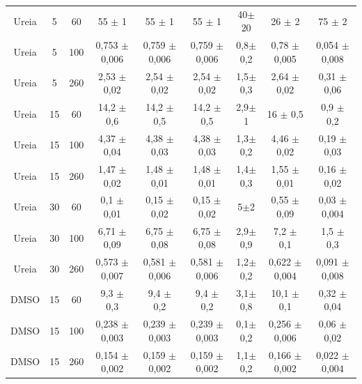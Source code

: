 \begin{table}[h]
\begin{adjustbox}{angle=90}
{\begin{tabular}{c c c | c c c c c c}
			Ureia   & 5          & 60       & 55      \(\pm\) 1      & 55       \(\pm\) 1      & 55        \(\pm\) 1       & 40\(\pm\)20   & 26          \(\pm\) 2      & 75          \(\pm\) 2      \\
			Ureia   & 5          & 100      & 0,753   \(\pm\) 0,006  & 0,759    \(\pm\) 0,006  & 0,759     \(\pm\) 0,006   & 0,8\(\pm\)0,2 & 0,78        \(\pm\) 0,005  & 0,054       \(\pm\) 0,008  \\
			Ureia   & 5          & 260      & 2,53    \(\pm\) 0,02   & 2,54     \(\pm\) 0,02   & 2,54      \(\pm\) 0,02    & 1,5\(\pm\)0,3 & 2,64        \(\pm\) 0,02   & 0,31        \(\pm\) 0,06   \\
			Ureia   & 15         & 60       & 14,2    \(\pm\) 0,6    & 14,2     \(\pm\) 0,5    & 14,2      \(\pm\) 0,5     & 2,9\(\pm\)1   & 16          \(\pm\) 0,5    & 0,9         \(\pm\) 0,2    \\
			Ureia   & 15         & 100      & 4,37    \(\pm\) 0,04   & 4,38     \(\pm\) 0,03   & 4,38      \(\pm\) 0,03    & 1,3\(\pm\)0,2 & 4,46        \(\pm\) 0,02   & 0,19        \(\pm\) 0,03   \\
			Ureia   & 15         & 260      & 1,47    \(\pm\) 0,02   & 1,48     \(\pm\) 0,01   & 1,48      \(\pm\) 0,01    & 1,4\(\pm\)0,3 & 1,55        \(\pm\) 0,01   & 0,16        \(\pm\) 0,02   \\
			Ureia   & 30         & 60       & 0,1     \(\pm\) 0,01   & 0,15     \(\pm\) 0,02   & 0,15      \(\pm\) 0,02    & 5\(\pm\)2     & 0,55        \(\pm\) 0,09   & 0,03        \(\pm\) 0,004  \\
			Ureia   & 30         & 100      & 6,71    \(\pm\) 0,09   & 6,75     \(\pm\) 0,08   & 6,75      \(\pm\) 0,08    & 2,9\(\pm\)0,9 & 7,2         \(\pm\) 0,1    & 1,5         \(\pm\) 0,3    \\
			Ureia   & 30         & 260      & 0,573   \(\pm\) 0,007  & 0,581    \(\pm\) 0,006  & 0,581     \(\pm\) 0,006   & 1,2\(\pm\)0,2 & 0,622       \(\pm\) 0,004  & 0,091       \(\pm\) 0,008  \\ \midrule
			DMSO    & 15         & 60       & 9,3     \(\pm\) 0,3    & 9,4      \(\pm\) 0,2    & 9,4       \(\pm\) 0,2     & 3,1\(\pm\)0,8 & 10,1        \(\pm\) 0,1    & 0,32        \(\pm\) 0,04   \\
			DMSO    & 15         & 100      & 0,238   \(\pm\) 0,003  & 0,239    \(\pm\) 0,003  & 0,239     \(\pm\) 0,003   & 0,1\(\pm\)0,2 & 0,256       \(\pm\) 0,006  & 0,06        \(\pm\) 0,02   \\
			DMSO    & 15         & 260      & 0,154   \(\pm\) 0,002  & 0,159    \(\pm\) 0,002  & 0,159     \(\pm\) 0,002   & 1,1\(\pm\)0,2 & 0,166       \(\pm\) 0,002  & 0,022       \(\pm\) 0,004  \\

\end{tabular}}
\end{adjustbox}
\end{table}
